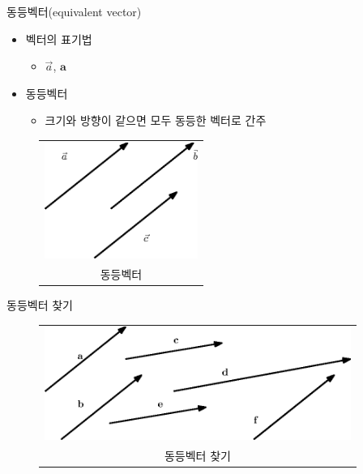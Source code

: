 \begin{frame}{동등벡터(equivalent vector)}

\begin{itemize}
\item 벡터의 표기법
\begin{itemize}
\item $\vec{a}$, $\mathbf a$
\end{itemize}
\end{itemize}

\begin{itemize}
\item 동등벡터
\begin{itemize}
\item 크기와 방향이 같으면 모두 동등한 벡터로 간주
\end{itemize}
\end{itemize}

\begin{figure}
\begin{tabular}{c}
\includegraphics[width=5cm]{Math_vector/equivalentVectors.eps}\\
{\tiny 동등벡터}
\end{tabular}
\end{figure}

\end{frame}

\begin{frame}{동등벡터 찾기}

\begin{figure}
\begin{tabular}{c}
\includegraphics[width=10cm]{./Math_vector/equivalentVectors2.eps}\\
{\tiny 동등벡터 찾기}
\end{tabular}
\end{figure}

\end{frame}

